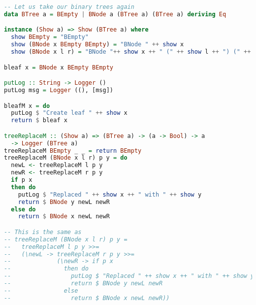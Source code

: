 \begin{lstlisting}[language=Haskell]
-- Let us take our binary trees again
data BTree a = BEmpty | BNode a (BTree a) (BTree a) deriving Eq

instance (Show a) => Show (BTree a) where
  show BEmpty = "BEmpty"
  show (BNode x BEmpty BEmpty) = "BNode " ++ show x
  show (BNode x l r) = "BNode "++ show x ++ " (" ++ show l ++ ") (" ++ show r ++ ")"

bleaf x = BNode x BEmpty BEmpty

putLog :: String -> Logger ()
putLog msg = Logger ((), [msg])

bleafM x = do
  putLog $ "Create leaf " ++ show x
  return $ bleaf x

treeReplaceM :: (Show a) => (BTree a) -> (a -> Bool) -> a
  -> Logger (BTree a)
treeReplaceM BEmpty _ _ = return BEmpty
treeReplaceM (BNode x l r) p y = do
  newL <- treeReplaceM l p y
  newR <- treeReplaceM r p y
  if p x
  then do
    putLog $ "Replaced " ++ show x ++ " with " ++ show y
    return $ BNode y newL newR
  else do
    return $ BNode x newL newR

-- This is the same as
-- treeReplaceM (BNode x l r) p y =
--   treeReplaceM l p y >>=
--   (\newL -> treeReplaceM r p y >>=
--             (\newR -> if p x
--               then do
--                 putLog $ "Replaced " ++ show x ++ " with " ++ show y
--                 return $ BNode y newL newR
--               else
--                 return $ BNode x newL newR))
\end{lstlisting}
